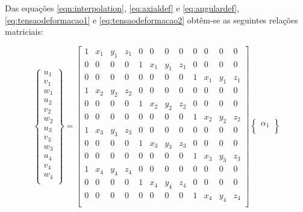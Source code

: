 Das equações \ref{eqn:interpolation}, \ref{eq:axialdef} e \ref{eq:angulardef}, \ref{eq:tensaodeformacao1} e \ref{eq:tensaodeformacao2} obtêm-se as seguintes relações matriciais:

\begin{equation} \label{eq:matrixdisplacement}
    \begin{Bmatrix}
        u_{1} \\
        v_{1} \\
        w_{1} \\
        u_{2} \\
        v_{2} \\
        w_{2} \\
        u_{3} \\
        v_{3} \\
        w_{3} \\
        u_{4} \\
        v_{4} \\
        w_{4} \\
    \end{Bmatrix}
    = 
    \begin{bmatrix}
    1 & x_{1} & y_{1} & z_{1} & 0 & 0 & 0 & 0 & 0 & 0 & 0 & 0 \\
    0 & 0 & 0 & 0 &  1 & x_{1} & y_{1} & z_{1} & 0 & 0 & 0 & 0 \\
    0 & 0 & 0 & 0 & 0 & 0 & 0 & 0 & 1 & x_{1} & y_{1} & z_{1} \\
    1 & x_{2} & y_{2} & z_{2} & 0 & 0 & 0 & 0 & 0 & 0 & 0 & 0 \\
    0 & 0 & 0 & 0 &  1 & x_{2} & y_{2} & z_{2} & 0 & 0 & 0 & 0 \\
    0 & 0 & 0 & 0 & 0 & 0 & 0 & 0 & 1 & x_{2} & y_{2} & z_{2} \\
    1 & x_{3} & y_{3} & z_{3} & 0 & 0 & 0 & 0 & 0 & 0 & 0 & 0 \\
    0 & 0 & 0 & 0 &  1 & x_{3} & y_{3} & z_{3} & 0 & 0 & 0 & 0 \\
    0 & 0 & 0 & 0 & 0 & 0 & 0 & 0 & 1 & x_{3} & y_{3} & z_{3} \\
    1 & x_{4} & y_{4} & z_{4} & 0 & 0 & 0 & 0 & 0 & 0 & 0 & 0 \\
    0 & 0 & 0 & 0 &  1 & x_{4} & y_{4} & z_{4} & 0 & 0 & 0 & 0 \\
    0 & 0 & 0 & 0 & 0 & 0 & 0 & 0 & 1 & x_{4} & y_{4} & z_{4} \\
    \end{bmatrix}
    \begin{Bmatrix}
        \alpha_{1} \\

\end{Bmatrix}
\end{equation}
